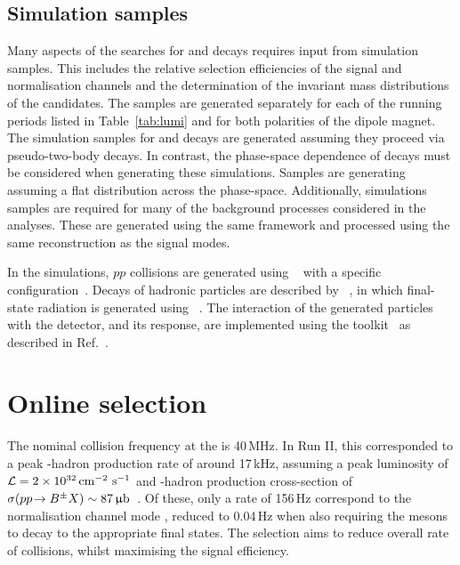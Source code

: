 \subsection{Simulation samples}
\label{sec:mc}

Many aspects of the searches for \decay{\Bp}{\Dsp\phiz} and \decay{\Bp}{\Dsp\Kp\Km} decays requires input from simulation samples. This includes the relative selection efficiencies of the signal and normalisation channels and the determination of the invariant mass distributions of the candidates.
The samples are generated separately for each of the running periods listed in Table~\ref{tab:lumi} and for both polarities of the \lhcb dipole magnet. The simulation samples for \decay{\Bp}{\Dsp\phiz} and \decay{\Bp}{\Dsp\Dzb} decays are generated assuming they proceed via pseudo-two-body decays. In contrast, the phase-space dependence of \decay{\Bp}{\Dsp\Kp\Km} decays must be considered when generating these simulations. Samples are generating assuming a flat distribution across the phase-space. 
Additionally, simulations samples are required for many of the background processes considered in the analyses. These are generated using the same framework and processed using the same reconstruction as the signal modes.


In the simulations, $pp$ collisions are generated using \pythia~\cite{Sjostrand:2007gs,Sjostrand:2006za} with a specific \lhcb configuration~\cite{LHCb-PROC-2010-056}.  Decays of hadronic particles are described by \evtgen~\cite{Lange:2001uf}, in which final-state radiation is generated using \photos~\cite{Golonka:2005pn}. The interaction of the generated particles with the detector, and its response, are implemented using the \geant toolkit~\cite{Allison:2006ve, *Agostinelli:2002hh} as described in Ref.~\cite{LHCb-PROC-2011-006}.


\section{Online selection}
\label{sec:selection_trigger}

The nominal collision frequency at the \lhc is 40\,MHz. In Run II, this corresponded to a peak \Bpm-hadron production rate of around 17\,kHz, assuming a peak luminosity of $\mathcal{L} = 2\times10^{32}\mathrm{ \,cm}^{-2}\,\mathrm{{\,s}}^{-1}$ and \Bpm-hadron production cross-section of $\sigma({p}{p}\!\rightarrow {\ensuremath{{B}^\pm}} X) \sim 87{\mathrm{ \,\upmu b}}$~\cite{LHCb-PAPER-2017-037}. Of these, only a rate of 156\,Hz correspond to the normalisation channel mode \decay{\Bp}{\Dsp\Dzb}, reduced to 0.04\,Hz when also requiring the \D mesons to decay to the appropriate final states. The selection aims to reduce overall rate of collisions, whilst maximising the signal efficiency. 

